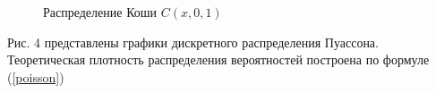 \documentclass[12pt]{article}
\begin{document}
\begin{flushleft}
\begin{figure}[h!]
\begin{minipage}[h]{0.325\linewidth}
        \end{minipage}
        \caption{Распределение Коши $C(x, 0, 1)$}
    \end{figure}

    \newpage

     Рис. 4 представлены графики дискретного распределения Пуассона. Теоретическая плотность распределения вероятностей построена по формуле (\ref{poisson})

    \begin{figure}[h!]
        \begin{minipage}[h]{0.325\linewidth}
        \end{minipage}
        \begin{minipage}[h]{0.325\linewidth}
        \end{minipage}

\end{figure}
\end{flushleft}
\end{document}
